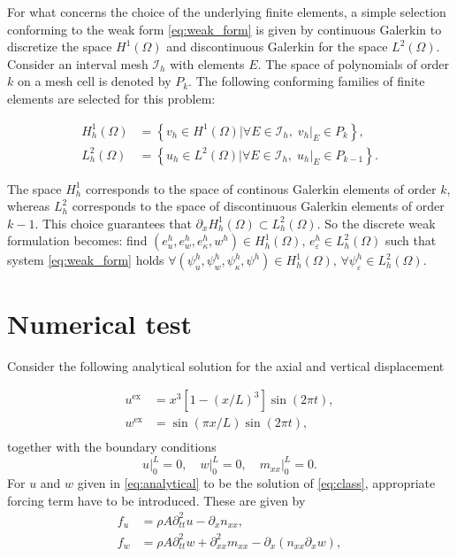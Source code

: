 \documentclass{ifacconf}
\begin{document}
For what concerns the choice of the underlying finite elements, a simple selection conforming to the weak form \eqref{eq:weak_form} is given by continuous Galerkin to discretize the space $H^1(\Omega)$ and discontinuous Galerkin for the space $L^2(\Omega)$. Consider an interval mesh $\mathcal{I}_h$ with elements $E$. The space of polynomials of order $k$ on a mesh cell is denoted by $P_k$. The following conforming families of finite elements are selected for this problem:

\begin{equation}
	\begin{aligned}
		H^1_h(\Omega) &= \left\{v_h \in H^1(\Omega)\vert \forall E \in \mathcal{I}_h, \; v_h\vert_E \in P_k \right\}, \\
		L^2_h(\Omega) &= \left\{u_h \in L^2(\Omega)\vert \forall E \in \mathcal{I}_h, \; u_h\vert_E \in P_{k-1} \right\}.
	\end{aligned}
\end{equation}

The space $H^1_h$ corresponds to the space of continous Galerkin elements of order $k$, whereas $L^2_h$ corresponds to the space of discontinuous Galerkin elements of order $k-1$. This choice guarantees that $\partial_x H^1_h(\Omega) \subset L^2_h(\Omega)$. So the discrete weak formulation becomes: find $(e_u^h, e_w^h, e_\kappa^h, w^h) \in H^1_h(\Omega), \, e_\varepsilon^h \in L_h^2(\Omega)$
such that system \eqref{eq:weak_form} holds $\forall (\psi_u^h, \psi_w^h, \psi_\kappa^h, \psi^h) \in H^1_h(\Omega), \, \forall \psi_\varepsilon^h \in L^2_h(\Omega)$.

\section{Numerical test}\label{sec:num_test}

Consider the following analytical solution for the axial and vertical displacement

\begin{equation}\label{eq:analytical}
	\begin{aligned}
		u^{\text{ex}} &= x^3[1-(x/L)^3] \sin(2 \pi t), \\
		w^{\text{ex}} &= \sin(\pi x/L)\sin(2 \pi t), \\
	\end{aligned}
\end{equation}
together with the boundary conditions
\begin{equation}
u\vert_0^L = 0, \quad w\vert_0^L =0, \quad m_{xx}\vert_{0}^L=0.
\end{equation}
For $u$ and $w$ given in \eqref{eq:analytical} to be the solution of \eqref{eq:class}, appropriate forcing term have to be introduced. These are given by 
\begin{equation}\label{eq:forcing}
	\begin{aligned}
		f_u &= \rho A \partial_{tt}^2 u - \partial_x n_{xx}, \\
		f_w &= \rho A \partial_{tt}^2 w + \partial_{xx}^2 m_{xx} - \partial_x(n_{xx} \partial_x w), \\
	\end{aligned}
\end{equation}
\end{document}
